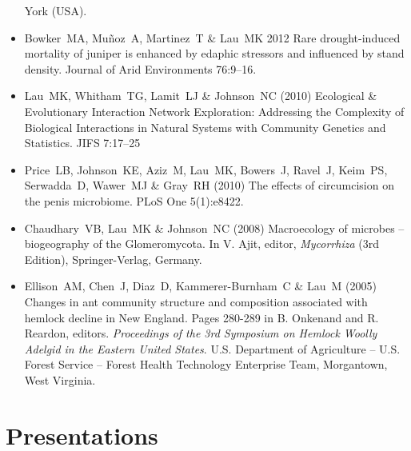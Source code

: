 \documentclass[a4paper]{article}
\begin{document}
\begin{itemize}
  York (USA).
\item
  Bowker~MA, Muñoz~A, Martinez~T \& Lau~MK 2012 Rare drought-induced
  mortality of juniper is enhanced by edaphic stressors and influenced
  by stand density. Journal of Arid Environments 76:9--16.
\item
  Lau~MK, Whitham~TG, Lamit~LJ \& Johnson~NC (2010) Ecological \&
  Evolutionary Interaction Network Exploration: Addressing the
  Complexity of Biological Interactions in Natural Systems with
  Community Genetics and Statistics. JIFS 7:17--25
\item
  Price~LB, Johnson~KE, Aziz~M, Lau~MK, Bowers~J, Ravel~J, Keim~PS,
  Serwadda~D, Wawer~MJ \& Gray~RH (2010) The effects of circumcision on
  the penis microbiome. PLoS One 5(1):e8422.
\item
  Chaudhary~VB, Lau~MK \& Johnson~NC (2008) Macroecology of microbes --
  biogeography of the Glomeromycota. In V. Ajit, editor,
  \emph{Mycorrhiza} (3rd Edition), Springer-Verlag, Germany.
\item
  Ellison~AM, Chen~J, Diaz~D, Kammerer-Burnham~C \& Lau~M (2005) Changes
  in ant community structure and composition associated with hemlock
  decline in New England. Pages 280-289 in B. Onkenand and R. Reardon,
  editors. \emph{Proceedings of the 3rd Symposium on Hemlock Woolly
  Adelgid in the Eastern United States}. U.S. Department of Agriculture
  -- U.S. Forest Service -- Forest Health Technology Enterprise Team,
  Morgantown, West Virginia.
\end{itemize}

\section{Presentations}\label{presentations}
\end{document}
